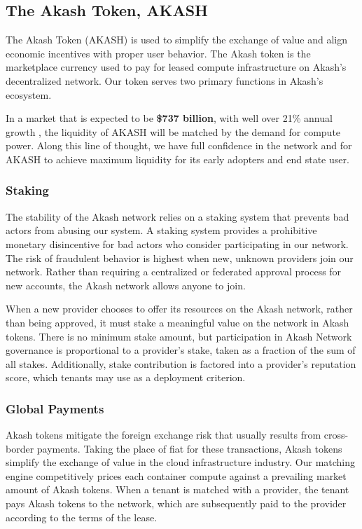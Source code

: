 \documentclass[11pt,english]{article}
\theoremstyle{definition}
\begin{document}
\subsection{The Akash Token, AKASH}

The Akash Token (AKASH) is used to simplify the exchange of value and align economic incentives with proper user behavior. The Akash token is the marketplace currency used to pay for leased compute infrastructure on Akash's decentralized network. Our token serves two primary functions in Akash's ecosystem.

In a market that is expected to be \textbf{\$737 billion}, with well over 21\% annual growth \cite{GARTNER}, the liquidity of AKASH will be matched by the demand for compute power. Along this line of thought, we have full confidence in the network and for AKASH to achieve maximum liquidity for its early adopters and end state user. 

\subsubsection{Staking}
The stability of the Akash network relies on a staking system that prevents bad actors from abusing our system. A staking system provides a prohibitive monetary disincentive for bad actors who consider participating in our network. The risk of fraudulent behavior is highest when new, unknown providers join our network. Rather than requiring a centralized or federated approval process for new accounts, the Akash network allows anyone to join.

When a new provider chooses to offer its resources on the Akash network, rather than being approved, it must stake a meaningful value on the network in Akash tokens. There is no minimum stake amount, but participation in Akash Network governance is proportional to a provider's stake, taken as a fraction of the sum of all stakes. Additionally, stake contribution is factored into a provider's reputation score, which tenants may use as a deployment criterion.

\subsubsection{Global Payments}

Akash tokens mitigate the foreign exchange risk that usually results from cross-border payments. Taking the place of fiat for these transactions, Akash tokens simplify the exchange of value in the cloud infrastructure industry. Our matching engine competitively prices each container compute against a prevailing market amount of Akash tokens. When a tenant is matched with a provider, the tenant pays Akash tokens to the network, which are subsequently paid to the provider according to the terms of the lease.
\end{document}
